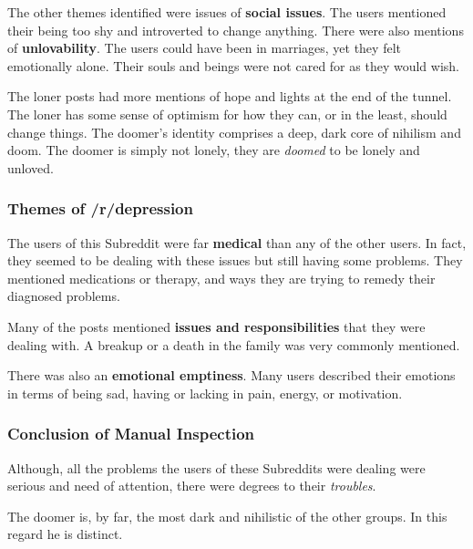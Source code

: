 \documentclass[../report.tex]{subfiles}
\begin{document}
The other themes identified were issues of \textbf{social issues}. The users mentioned their being too shy and introverted to change anything. 
There were also mentions of \textbf{unlovability}.
The users could have been in marriages, yet they felt emotionally alone.
Their souls and beings were not cared for as they would wish.

The loner posts had more mentions of hope and lights at the end of the tunnel. 
The loner has some sense of optimism for how they can, or in the least, should change things.
The doomer's identity comprises a deep, dark core of nihilism and doom.
The doomer is simply not lonely, they are \textit{doomed} to be lonely and unloved. 

\subsubsection{Themes of /r/depression}
The users of this Subreddit were far \textbf{medical} than any of the other users. 
In fact, they seemed to be dealing with these issues but still having some problems. 
They mentioned medications or therapy, and ways they are trying to remedy their diagnosed problems. 

Many of the posts mentioned \textbf{issues and responsibilities} that they were dealing with.
A breakup or a death in the family was very commonly mentioned. 

There was also an \textbf{emotional emptiness}. Many users described their emotions in terms of being sad, having or lacking in pain, energy, or motivation. 

\subsubsection{Conclusion of Manual Inspection}
Although, all the problems the users of these Subreddits were dealing were serious and need of attention, there were degrees to their \textit{troubles}.

The doomer is, by far, the most dark and nihilistic of the other groups. In this regard he is distinct. 
\end{document}
